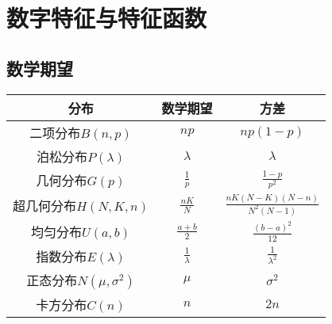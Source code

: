 \chapter{数字特征与特征函数}
\section{数学期望}
\begin{table}[H]
    \centering
    \begin{tabular}{c|c|c}
        \hline
        分布 & 数学期望 & 方差\\
        \hline
        二项分布\(B(n,p)\) & \(np\) & \(np(1-p)\) \\
        泊松分布\(P(\lambda)\) & \(\lambda\) & \(\lambda\) \\
        几何分布\(G(p)\) & \(\frac{1}{p}\) & \(\frac{1-p}{p^2}\) \\
        超几何分布\(H(N,K,n)\) & \(\frac{nK}{N}\) &
        \(\frac{nK(N-K)(N-n)}{N^2(N-1)}\) \\
        均匀分布\(U(a,b)\) & \(\frac{a+b}{2}\) & \(\frac{(b-a)^2}{12}\) \\
        指数分布\(E(\lambda)\) & \(\frac{1}{\lambda}\) &
        \(\frac{1}{\lambda^2}\) \\
        正态分布\(N(\mu,\sigma^2)\) & \(\mu\) & \(\sigma^2\) \\
        卡方分布\(C(n)\) & \(n\) & \(2n\) \\
        \hline
    \end{tabular}
\end{table}